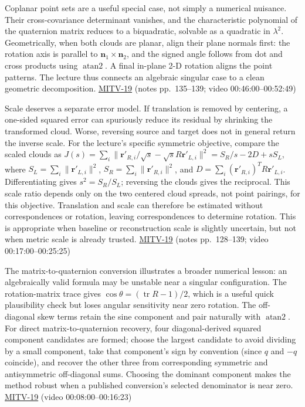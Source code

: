 Coplanar point sets are a useful special case, not simply a numerical nuisance. Their cross-covariance determinant vanishes, and the characteristic polynomial of the quaternion matrix reduces to a biquadratic, solvable as a quadratic in \(\lambda^2\). Geometrically, when both clouds are planar, align their plane normals first: the rotation axis is parallel to \(\mathbf{n}_1\times\mathbf{n}_2\), and the signed angle follows from dot and cross products using \(\operatorname{atan2}\). A final in-plane 2-D rotation aligns the point patterns. The lecture thus connects an algebraic singular case to a clean geometric decomposition. \hyperref[04-visual-computing-ii-ch036-mitv-19---absolute-orientation-in-closed-form-outliers-and-robustness-ransac]{MITV-19} (notes pp.~135--139; video 00:46:00--00:52:49)

Scale deserves a separate error model. If translation is removed by centering, a one-sided squared error can spuriously reduce its residual by shrinking the transformed cloud. Worse, reversing source and target does not in general return the inverse scale. For the lecture's specific symmetric objective, compare the scaled clouds as \(J(s)=\sum_i\|\mathbf r'_{R,i}/\sqrt{s}-\sqrt{s}R\mathbf r'_{L,i}\|^2=S_R/s-2D+sS_L\), where \(S_L=\sum_i\|\mathbf r'_{L,i}\|^2\), \(S_R=\sum_i\|\mathbf r'_{R,i}\|^2\), and \(D=\sum_i(\mathbf r'_{R,i})^TR\mathbf r'_{L,i}\). Differentiating gives \(s^2=S_R/S_L\); reversing the clouds gives the reciprocal. This scale ratio depends only on the two centered cloud spreads, not point pairings, for this objective. Translation and scale can therefore be estimated without correspondences or rotation, leaving correspondences to determine rotation. This is appropriate when baseline or reconstruction scale is slightly uncertain, but not when metric scale is already trusted. \hyperref[04-visual-computing-ii-ch036-mitv-19---absolute-orientation-in-closed-form-outliers-and-robustness-ransac]{MITV-19} (notes pp.~128--139; video 00:17:00--00:25:25)

The matrix-to-quaternion conversion illustrates a broader numerical lesson: an algebraically valid formula may be unstable near a singular configuration. The rotation-matrix trace gives \(\cos\theta=(\operatorname{tr}R-1)/2\), which is a useful quick plausibility check but loses angular sensitivity near zero rotation. The off-diagonal skew terms retain the sine component and pair naturally with \(\operatorname{atan2}\). For direct matrix-to-quaternion recovery, four diagonal-derived squared component candidates are formed; choose the largest candidate to avoid dividing by a small component, take that component's sign by convention (since \(q\) and \(-q\) coincide), and recover the other three from corresponding symmetric and antisymmetric off-diagonal sums. Choosing the dominant component makes the method robust when a published conversion's selected denominator is near zero. \hyperref[04-visual-computing-ii-ch036-mitv-19---absolute-orientation-in-closed-form-outliers-and-robustness-ransac]{MITV-19} (video 00:08:00--00:16:23)

